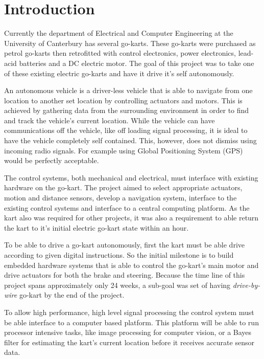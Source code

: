 \section{Introduction}
  Currently the department of Electrical and Computer Engineering at the
  University of Canterbury has several go-karts. These go-karts were purchased
  as petrol go-karts then retrofitted with control electronics, power
  electronics, lead-acid batteries and a DC electric motor. The goal of this
  project was to take one of these existing electric go-karts and have it drive
  it's self autonomously. 

  An autonomous vehicle is a driver-less vehicle that is able to navigate from
  one location to another set location by controlling actuators and motors. This
  is achieved by gathering data from the surrounding environment in order to
  find and track the vehicle's current location. While the vehicle can have
  communications off the vehicle, like off loading signal processing, it is
  ideal to have the vehicle completely self contained. This, however, does not
  dismiss using incoming radio signals. For example using Global Positioning
  System (GPS) would be perfectly acceptable.

  The control systems, both mechanical and electrical, must interface with
  existing hardware on the go-kart. The project aimed to select appropriate
  actuators, motion and distance sensors, develop a navigation system, interface
  to the existing control systems and interface to a central computing platform.
  As the kart also was required for other projects, it was also a requirement to
  able return the kart to it's initial electric go-kart state within an hour.

  To be able to drive a go-kart autonomously, first the kart must be able drive
  according to given digital instructions. So the initial milestone is to build
  embedded hardware systems that is able to control the go-kart's main motor and
  drive actuators for both the brake and steering. Because the time line of this
  project spans approximately only 24 weeks, a sub-goal was set of having
  \emph{drive-by-wire} go-kart by the end of the project.

  To allow high performance, high level signal processing the control system
  must be able interface to a computer based platform. This platform will be
  able to run processor intensive tasks, like image processing for computer
  vision\cite{openCV}, or a Bayes filter for estimating the kart's current
  location before it receives accurate sensor data.

